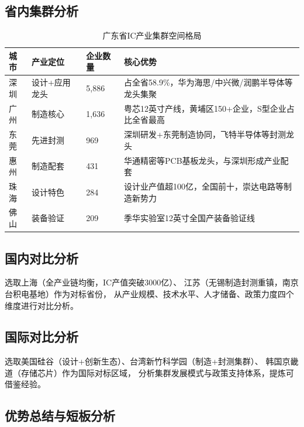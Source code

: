 \documentclass[12pt,a4paper]{ctexart}
\newcommand{\tableHeaderRow}{\rowcolor{tealPrimary}\color{white}}
\newcommand{\tableOddRow}{\rowcolor{mintBG}}
\newcommand{\tableEvenRow}{\rowcolor{white}}
\begin{document}
\subsection{省内集群分析}
\label{sec:provincial_cluster}

\begin{table}[H]
\centering
\caption{广东省IC产业集群空间格局}
\label{tab:cluster}
\begin{tabular}{lllp{5cm}}
\toprule
\tableHeaderRow
\textbf{城市}  & \textbf{产业定位}   & \textbf{企业数量} & \textbf{核心优势} \\
\midrule
\tableOddRow  深圳 & 设计+应用龙头  & 5,886 & 占全省58.9\%，华为海思/中兴微/润鹏半导体等龙头集聚 \\
\tableEvenRow 广州 & 制造核心      & 1,636 & 粤芯12英寸产线，黄埔区150+企业，S型企业占比全省最高 \\
\tableOddRow  东莞 & 先进封测      & 969   & 深圳研发+东莞制造协同，飞特半导体等封测龙头 \\
\tableEvenRow 惠州 & 制造配套      & 431   & 华通精密等PCB基板龙头，与深圳形成产业配套 \\
\tableOddRow  珠海 & 设计特色      & 284   & 设计业产值超100亿，全国前十，崇达电路等制造新势力 \\
\tableEvenRow 佛山 & 装备验证      & 209   & 季华实验室12英寸全国产装备验证线 \\
\bottomrule
\end{tabular}
\end{table}

\subsection{国内对比分析}
\label{sec:domestic_comparison}

选取上海（全产业链均衡，IC产值突破3000亿）、
江苏（无锡制造封测重镇，南京台积电基地）作为对标省份，
从产业规模、技术水平、人才储备、政策力度四个维度进行对比分析。

\subsection{国际对比分析}
\label{sec:international_comparison}

选取美国硅谷（设计+创新生态）、台湾新竹科学园（制造+封测集群）、
韩国京畿道（存储芯片）作为国际对标区域，
分析集群发展模式与政策支持体系，提炼可借鉴经验。

\subsection{优势总结与短板分析}
\label{sec:swot}
\end{document}
